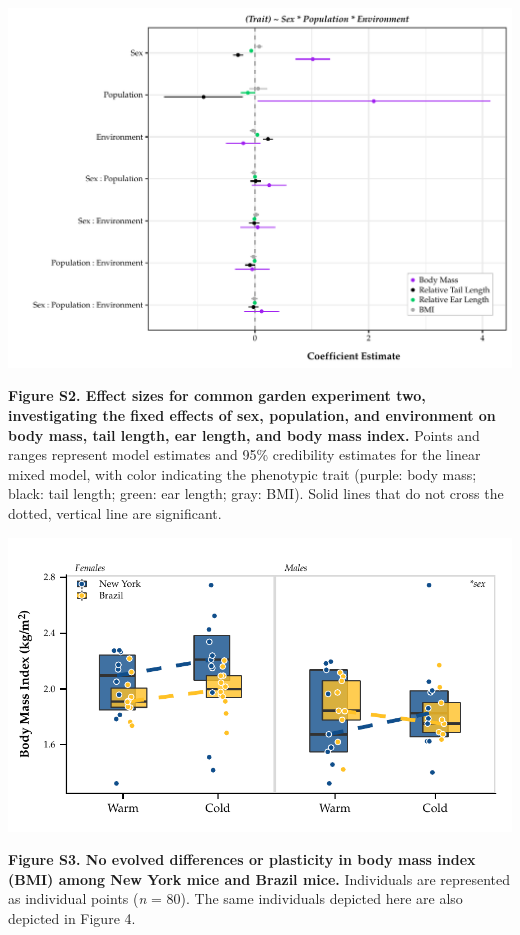 \documentclass[]{article}
\begin{document}
\includegraphics{../results/figures/RXNsModel_relative.pdf}

\textbf{Figure S2. Effect sizes for common garden experiment two,
investigating the fixed effects of sex, population, and environment on
body mass, tail length, ear length, and body mass index.} Points and
ranges represent model estimates and 95\% credibility estimates for the
linear mixed model, with color indicating the phenotypic trait (purple:
body mass; black: tail length; green: ear length; gray: BMI). Solid
lines that do not cross the dotted, vertical line are significant.

\newpage

\includegraphics{../results/figures/RXNs_BMI.pdf}

\textbf{Figure S3. No evolved differences or plasticity in body mass
index (BMI) among New York mice and Brazil mice.} Individuals are
represented as individual points (\emph{n} = 80). The same individuals
depicted here are also depicted in Figure 4.
\end{document}
